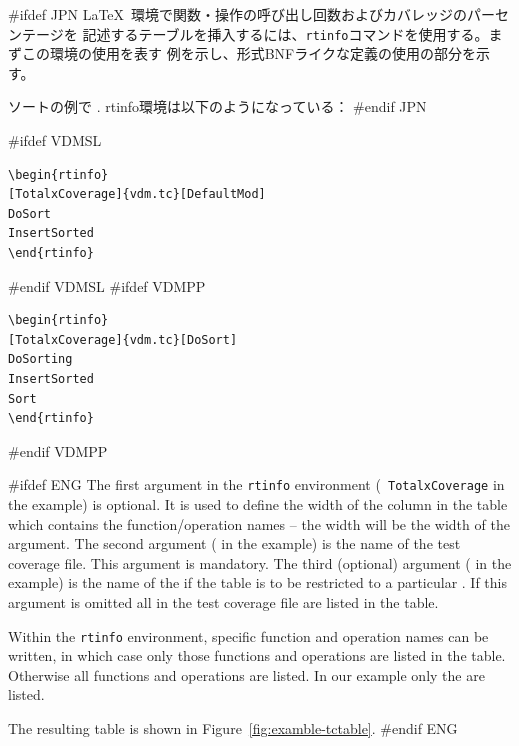 \documentclass[\pformat,12pt]{article}
\begin{document}
#ifdef JPN
\LaTeX\ 環境で関数・操作の呼び出し回数およびカバレッジのパーセンテージを
記述するテーブルを挿入するには、{\tt rtinfo}コマンドを使用する。まずこの環境の使用を表す
例を示し、形式BNFライクな定義の使用の部分を示す。
  
ソートの例で
.
rtinfo環境は以下のようになっている：
#endif JPN

#ifdef VDMSL
\begin{verbatim}
\begin{rtinfo}
[TotalxCoverage]{vdm.tc}[DefaultMod]
DoSort
InsertSorted
\end{rtinfo}
\end{verbatim}
#endif VDMSL
#ifdef VDMPP
\begin{verbatim}
\begin{rtinfo}
[TotalxCoverage]{vdm.tc}[DoSort]
DoSorting
InsertSorted
Sort
\end{rtinfo}
\end{verbatim}
#endif VDMPP

#ifdef ENG
The first argument in the {\tt rtinfo} environment ({\tt
  TotalxCoverage} in the example) is optional. 
It is used to define the width of the column in the table which
contains the function/operation names -- the width will be the width
of the argument.  The second argument
( in the example) is the  
name of the test coverage file.  This argument is mandatory.  The third
(optional) argument ( in the example) is the name of the
 if the table is to be
restricted to a  particular
. If this argument is
omitted all  in the test
coverage file are listed in the table.

Within the {\tt rtinfo} environment, specific function and
operation names can be written, in which case only those
functions and operations are listed in the table. Otherwise all
functions and operations are listed.  In our example only the 
 are listed.

The resulting table is shown in Figure~\ref{fig:examble-tctable}.
#endif ENG
\end{document}
